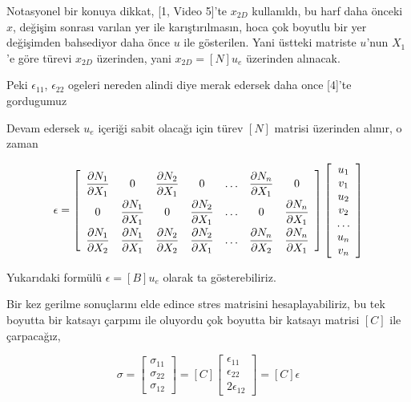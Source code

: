 \documentclass[12pt,fleqn]{article}\usepackage{../../common}
\begin{document}
Notasyonel bir konuya dikkat, [1, Video 5]'te $x_{2D}$ kullanıldı, bu harf daha
önceki $x$, değişim sonrası varılan yer ile karıştırılmasın, hoca çok boyutlu
bir yer değişimden bahsediyor daha önce $u$ ile gösterilen.  Yani üstteki
matriste $u$'nun $X_1$'e göre türevi $x_{2D}$ üzerinden, yani $x_{2D} = [N] u_e$
üzerinden alınacak.

Peki $\epsilon_{11}$, $\epsilon_{22}$ ogeleri nereden alindi diye merak
edersek daha once [4]'te gordugumuz 

Devam edersek $u_e$ içeriği sabit olacağı için türev $[N]$ matrisi üzerinden
alınır, o zaman

$$
\renewcommand*{\arraystretch}{2.0}
\epsilon =
\left[\begin{array}{ccccccc}
\dfrac{\partial N_1}{\partial X_1} & 0 &
\dfrac{\partial N_2}{\partial X_1} & 0 & \dots &
\dfrac{\partial N_n}{\partial X_1} & 0  \\
0 & \dfrac{\partial N_1}{\partial X_1} &
0 & \dfrac{\partial N_2}{\partial X_1} & \dots &
0 & \dfrac{\partial N_n}{\partial X_1}  \\
\dfrac{\partial N_1}{\partial X_2} & \dfrac{\partial N_1}{\partial X_1} & 
\dfrac{\partial N_2}{\partial X_2} & \dfrac{\partial N_2}{\partial X_1} & \dots &
\dfrac{\partial N_n}{\partial X_2} & \dfrac{\partial N_n}{\partial X_1} 
\end{array}\right]
\renewcommand*{\arraystretch}{1.0}
\left[\begin{array}{c}
u_1 \\ v_1 \\ u_2 \\ v_2 \\ \dots \\ u_n \\ v_n
\end{array}\right]
$$

Yukarıdaki formülü $\epsilon = [B] u_e$ olarak ta gösterebiliriz.

Bir kez gerilme sonuçlarını elde edince stres matrisini hesaplayabiliriz, bu tek
boyutta bir katsayı çarpımı ile oluyordu çok boyutta bir katsayı matrisi $[C]$
ile çarpacağız,

$$
\sigma = \left[\begin{array}{c}
\sigma_{11} \\ \sigma_{22} \\ \sigma_{12}
\end{array}\right] =
[C] \left[\begin{array}{c}
\epsilon_{11} \\ \epsilon_{22} \\ 2 \epsilon_{12}
\end{array}\right] = [C] \epsilon
$$
\end{document}
